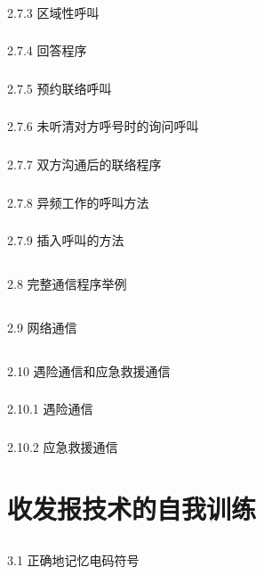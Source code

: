 \documentclass[12pt,UTF8]{ctexbook}
\begin{document}
\subsection{}2.7.3 区域性呼叫
\subsection{}2.7.4 回答程序
\subsection{}2.7.5 预约联络呼叫
\subsection{}2.7.6 未听清对方呼号时的询问呼叫
\subsection{}2.7.7 双方沟通后的联络程序
\subsection{}2.7.8 异频工作的呼叫方法
\subsection{}2.7.9 插入呼叫的方法
\section{}2.8 完整通信程序举例
\section{}2.9 网络通信
\section{}2.10 遇险通信和应急救援通信
\subsection{}2.10.1 遇险通信
\subsection{}2.10.2 应急救援通信

\chapter{收发报技术的自我训练}

\section{}3.1 正确地记忆电码符号
\end{document}
